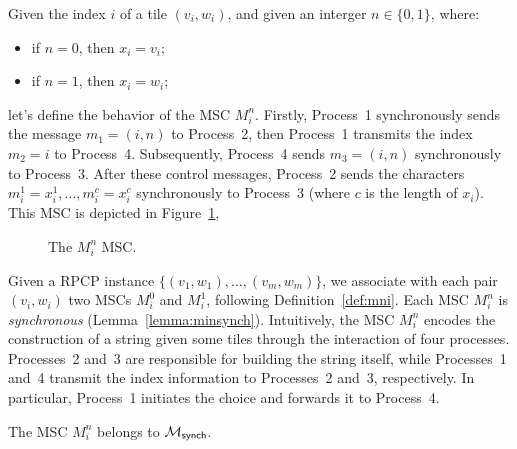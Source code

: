 \begin{definition}[$M^n_i$]\label{def:mni}
	Given the index $i$ of a tile $(v_i, w_i)$, and
	given an interger $n\in\{0,1\}$, where:
	\begin{itemize}
		\item if $n=0$, then $x_i=v_i$;
		\item if $n=1$, then $x_i=w_i$;
	\end{itemize}
	let's define the behavior of the MSC $M^n_i$.
	Firstly, Process~1 synchronously sends the message
	$m_1 = (i, n)$ to Process~2, then Process~1 transmits the index $m_2=i$
	to Process~4. Subsequently, Process~4 sends $m_3 = (i, n)$
	synchronously to Process~3. After these control messages, Process~2
	sends the characters $m_i^1 = x_i^1,..., m_i^c = x_i^c$
	synchronously to Process~3 (where $c$ is the length of $x_i$).
	This MSC is depicted in Figure~\ref{fig:mni}, 

	\begin{figure}[!ht]
		\centering
		\begin{msc}[draw frame=none, draw head=none, msc keyword=, head height=0px, label distance=0.5ex, foot height=0px, foot distance=0px]{}

		\end{msc}
		\caption{The $M_i^n$ MSC.}
		\label{fig:mni}
	\end{figure}

\end{definition}

Given a RPCP instance $\{(v_1,w_1),\ldots,(v_m,w_m)\}$, we associate  
with each pair $(v_i,w_i)$ two MSCs $M^0_i$ and $M^1_i$, following  
Definition~\ref{def:mni}. Each MSC $M^n_i$ is \emph{synchronous}  
(Lemma~\ref{lemma:minsynch}). Intuitively, the MSC $M_i^n$ encodes the  
construction of a string given some tiles through the interaction of four processes.  
Processes~2 and~3 are responsible for building the string itself,  
while Processes~1 and~4 transmit the index information to Processes~2  
and~3, respectively. In particular, Process~1 initiates the choice and  
forwards it to Process~4.

\bigskip

\begin{lemma}\label{lemma:minsynch}
	The MSC $M_i^n$ belongs to $\mathcal{M}_{\mathsf{synch}}$.
\end{lemma}

